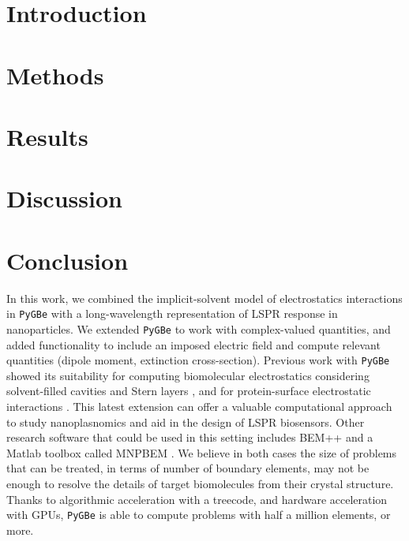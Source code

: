 \documentclass[pre,twocolumn,superscriptaddress]{revtex4}
\newcommand{\pygbe}{\texttt{PyGBe}\xspace}
\begin{document}
\maketitle


\section{Introduction} \label{sec:intro}


\section{Methods}\label{sec:methods}
 

\section{Results} \label{sec:results}


\section{Discussion} \label{sec:discussion}


\section{Conclusion}
%

In this work, we combined the implicit-solvent model of electrostatics interactions in \pygbe 
with a long-wavelength representation of LSPR response in nanoparticles. 
We extended \pygbe to work with complex-valued quantities, and added functionality to 
include an imposed electric field and compute relevant quantities 
(dipole moment, extinction cross-section). 
Previous work with \pygbe showed its suitability for computing 
biomolecular electrostatics considering solvent-filled cavities and Stern layers \cite{CooperBardhanBarba2013}, 
and for protein-surface electrostatic interactions \cite{CooperBarba2016}.
This latest extension can offer a valuable computational approach to study nanoplasnomics and aid in the design of LSPR biosensors. 
Other research software that could be used in this setting includes  
BEM++ \cite{SmigajETal2015} and a Matlab toolbox called MNPBEM \cite{HohenesterTrugler2012}. 
We believe in both cases the size of problems that can be treated, in terms of number of boundary elements, may not be enough to resolve the details of target biomolecules from their crystal structure. 
Thanks to algorithmic acceleration with a treecode, and hardware acceleration with GPUs, \pygbe is able to compute problems with half a million elements, or more.
\end{document}
